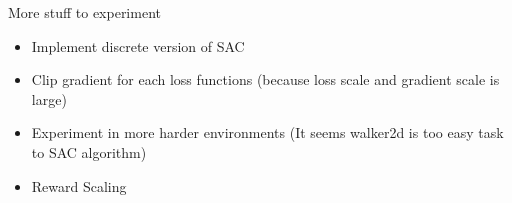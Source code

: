 \documentclass[8pt]{beamer}
\newcommand{\tb}[1]{\textbf{#1}}
\begin{document}
\begin{frame}{More stuff to experiment}
    \begin{itemize}
        \item Implement discrete version of SAC
        \item Clip gradient for each loss functions (because loss scale and gradient scale is large)
        \item Experiment in more harder environments (It seems walker2d is too easy task to SAC algorithm)
        \item Reward Scaling
    \end{itemize}
\end{frame}





\end{document}
